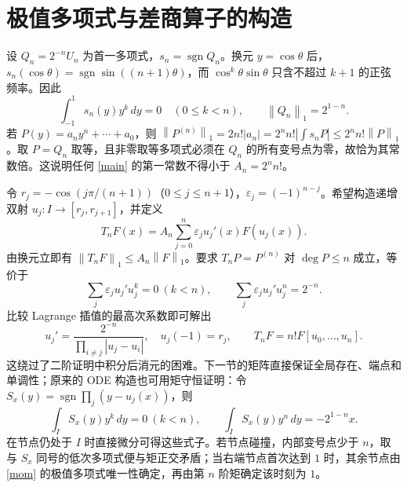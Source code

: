 \documentclass[11pt,a4paper,fontset=fandol]{ctexart}
\newcommand{\sgn}{\operatorname{sgn}}
\newcommand{\norm}[1]{\left\|#1\right\|_1}
\theoremstyle{remark}\newtheorem{conjecture}{猜想}
\begin{document}
\section{极值多项式与差商算子的构造}
设 $Q_n=2^{-n}U_n$ 为首一多项式，$s_n=\sgn Q_n$。换元 $y=\cos\theta$ 后，$s_n(\cos\theta)=\sgn\sin((n+1)\theta)$，而 $\cos^k\theta\sin\theta$ 只含不超过 $k+1$ 的正弦频率。因此
\begin{equation}\label{mom}
 \int_{-1}^1s_n(y)y^k\,dy=0\quad(0\le k<n),\qquad \norm{Q_n}=2^{1-n}.
\end{equation}
若 $P(y)=a_ny^n+\cdots+a_0$，则 $\norm{P^{(n)}}=2n!|a_n|=2^nn!|\int s_nP|\le 2^nn!\norm P$。取 $P=Q_n$ 取等，且非零取等多项式必须在 $Q_n$ 的所有变号点为零，故恰为其常数倍。这说明任何 \eqref{main} 的第一常数不得小于 $A_n=2^nn!$。

令 $r_j=-\cos(j\pi/(n+1))$（$0\le j\le n+1$），$\varepsilon_j=(-1)^{n-j}$。希望构造递增双射 $u_j:I\to[r_j,r_{j+1}]$，并定义
\begin{equation}\label{T}
 T_nF(x)=A_n\sum_{j=0}^n\varepsilon_j u_j'(x)F(u_j(x)).
\end{equation}
由换元立即有 $\norm{T_nF}\le A_n\norm F$。要求 $T_nP=P^{(n)}$ 对 $\deg P\le n$ 成立，等价于
\[
 \sum_j\varepsilon_j u_j'u_j^k=0\ (k<n),\qquad \sum_j\varepsilon_j u_j'u_j^n=2^{-n}.
\]
比较 Lagrange 插值的最高次系数即可解出
\begin{equation}\label{ode}
 u_j'=\frac{2^{-n}}{\prod_{i\ne j}|u_j-u_i|},\quad u_j(-1)=r_j,\qquad T_nF=n!F[u_0,\ldots,u_n].
\end{equation}
这绕过了二阶证明中积分后消元的困难。下一节的矩阵直接保证全局存在、端点和单调性；原来的 ODE 构造也可用矩守恒证明：令 $S_x(y)=\sgn\prod_j(y-u_j(x))$，则
\begin{equation}\label{S-mom}
 \int_I S_x(y)y^k\,dy=0\ (k<n),\qquad \int_I S_x(y)y^n\,dy=-2^{1-n}x.
\end{equation}
在节点仍处于 $I$ 时直接微分可得这些式子。若节点碰撞，内部变号点少于 $n$，取与 $S_x$ 同号的低次多项式便与矩正交矛盾；当右端节点首次达到 $1$ 时，其余节点由 \eqref{mom} 的极值多项式唯一性确定，再由第 $n$ 阶矩确定该时刻为 $1$。
\end{document}
